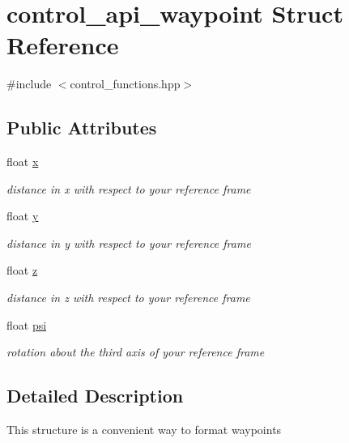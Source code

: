 \hypertarget{structcontrol__api__waypoint}{}\section{control\+\_\+api\+\_\+waypoint Struct Reference}
\label{structcontrol__api__waypoint}


{\ttfamily \#include $<$control\+\_\+functions.\+hpp$>$}

\subsection*{Public Attributes}
\begin{DoxyCompactItemize}
\item 
float \mbox{\hyperlink{structcontrol__api__waypoint_a381813ee0649f54116dec8d8ed78b26e}{x}}
\begin{DoxyCompactList}\small\item\em distance in x with respect to your reference frame \end{DoxyCompactList}\item 
float \mbox{\hyperlink{structcontrol__api__waypoint_ac92d8860930259ccb19aa91072d94546}{y}}
\begin{DoxyCompactList}\small\item\em distance in y with respect to your reference frame \end{DoxyCompactList}\item 
float \mbox{\hyperlink{structcontrol__api__waypoint_af77b8d62f18d1b4c1884b46147751b49}{z}}
\begin{DoxyCompactList}\small\item\em distance in z with respect to your reference frame \end{DoxyCompactList}\item 
float \mbox{\hyperlink{structcontrol__api__waypoint_a053fed6c42cdeda2029d2db548f357b4}{psi}}
\begin{DoxyCompactList}\small\item\em rotation about the third axis of your reference frame \end{DoxyCompactList}\end{DoxyCompactItemize}


\subsection{Detailed Description}
This structure is a convenient way to format waypoints 

